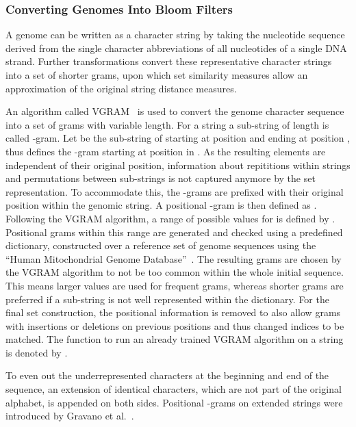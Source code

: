 \documentclass{llncs}
\begin{document}
\subsubsection{Converting Genomes Into Bloom Filters}
\label{sec:bloomCreation}

A genome can be written as a character string by taking the nucleotide sequence derived from the single character abbreviations of all nucleotides of a single DNA strand.
Further transformations convert these representative character strings into a set of shorter grams, upon which set similarity measures allow an approximation of the original string distance measures. 

An algorithm called VGRAM~\cite{Li07} is used to convert the genome character sequence into a set of grams with variable length.
For a string  a sub-string of length  is called -gram.
Let  be the sub-string of  starting at position  and ending at position , thus  defines the -gram starting at position  in .
As the resulting elements are independent of their original position, information about repititions within strings and permutations between sub-strings is not captured anymore by the set representation.
To accommodate this, the -grams are prefixed with their original position within the genomic string.
A positional -gram is then defined as .
Following the VGRAM algorithm, a range of possible values for  is defined by .
Positional grams within this range are generated and checked using a predefined dictionary, constructed over a reference set of genome sequences using the ``Human Mitochondrial Genome Database''~\cite{mtDnaDb06}.
The resulting grams are chosen by the VGRAM algorithm to not be too common within the whole initial sequence.
This means larger  values are used for frequent grams, whereas shorter grams are preferred if a sub-string is not well represented within the dictionary.
For the final set construction, the positional information is removed to also allow grams with insertions or deletions on previous positions and thus changed indices to be matched.
The function to run an already trained VGRAM algorithm on a string  is denoted by .











To even out the underrepresented characters at the beginning and end of the sequence, an extension of  identical characters, which are not part of the original alphabet, is appended on both sides. Positional -grams on extended strings were introduced by Gravano et al.~\cite{Gra01}.
\end{document}
